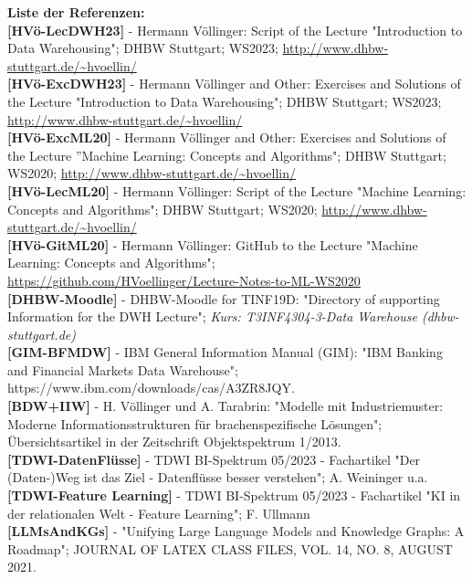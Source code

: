 \documentclass[12pt]{article}
\begin{document}
\textbf{Liste der Referenzen:} \\[0.3cm] 
%
\textbf{[HVö-LecDWH23]} - Hermann Völlinger: Script of the Lecture "Introduction to Data Warehousing"; DHBW Stuttgart; WS2023; \url{http://www.dhbw-stuttgart.de/~hvoellin/}\\[0.2cm] 
%
\textbf{[HVö-ExcDWH23]} - Hermann Völlinger and Other: Exercises and Solutions of the Lecture "Introduction to Data Warehousing"; DHBW Stuttgart; WS2023; \url{http://www.dhbw-stuttgart.de/~hvoellin/}\\[0.2cm] 
%
\textbf{[HVö-ExcML20]} - Hermann Völlinger and Other: Exercises and Solutions of the Lecture ”Machine Learning: Concepts and Algorithms"; DHBW Stuttgart; WS2020; \url{http://www.dhbw-stuttgart.de/~hvoellin/}\\[0.2cm] 
%
\textbf{[HVö-LecML20]} - Hermann Völlinger: Script of the Lecture "Machine Learning: Concepts and Algorithms"; DHBW Stuttgart; WS2020; \url{http://www.dhbw-stuttgart.de/~hvoellin/}\\[0.2cm]  
%
\textbf{[HVö-GitML20]} - Hermann Völlinger: GitHub to the Lecture "Machine Learning: Concepts and Algorithms";\\ 
\url{https://github.com/HVoellinger/Lecture-Notes-to-ML-WS2020}\\[0.2cm] 
%
\textbf{[DHBW-Moodle]} - DHBW-Moodle for TINF19D: "Directory of supporting Information for the DWH Lecture"; \textit{Kurs: T3INF4304-3-Data Warehouse (dhbw-stuttgart.de)}\\[0.2cm] 
%
\textbf{[GIM-BFMDW]} - IBM General Information Manual (GIM): "IBM Banking and Financial Markets Data Warehouse";  https://www.ibm.com/downloads/cas/A3ZR8JQY. \\[0.2cm] 
%
\textbf{[BDW+IIW]} - H. Völlinger und A. Tarabrin: "Modelle mit Industriemuster:
Moderne Informationsstrukturen für brachenspezifische Lösungen"; Übersichtsartikel in der Zeitschrift Objektspektrum 1/2013.\\[0.2cm] 
%
\textbf{[TDWI-DatenFlüsse]} - TDWI BI-Spektrum 05/2023 - Fachartikel "Der (Daten-)Weg ist das Ziel - Datenflüsse besser verstehen"; A. Weininger u.a.\\[0.2cm] 
%
\textbf{[TDWI-Feature Learning]} - TDWI BI-Spektrum  05/2023 - Fachartikel "KI in der relationalen Welt - Feature Learning"; F. Ullmann\\[0.2cm] 
%
\textbf{[LLMsAndKGs]} - "Unifying Large Language Models and Knowledge Graphs: A Roadmap"; JOURNAL OF LATEX CLASS FILES, VOL. 14, NO. 8, AUGUST 2021.\\[0.2cm] 
\end{document}
